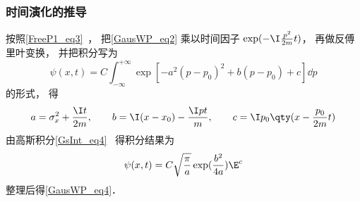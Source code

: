 \subsubsection{时间演化的推导}
按照\autoref{FreeP1_eq3}~， 把\autoref{GausWP_eq2} 乘以时间因子 $\exp(-\I \frac{p^2}{2m}t)$， 再做反傅里叶变换， 并把积分写为
\begin{equation}
\psi(x, t) = C\int_{-\infty}^{+\infty} \exp[-a^2(p-p_0)^2 + b(p-p_0) + c] \dd{p}
\end{equation}
的形式， 得
\begin{equation}
a = \sigma_x^2 + \frac{\I t}{2m}, \qquad
b = \I(x-x_0) - \frac{\I pt}{m}, \qquad
c = \I p_0 \qty(x - \frac{p_0}{2m} t)
\end{equation}
由高斯积分\autoref{GsInt_eq4}~ 得积分结果为
\begin{equation}
\psi(x, t) = C\sqrt{\frac{\pi}{a}} \exp(\frac{b^2}{4a})\E^c
\end{equation}
整理后得\autoref{GausWP_eq4}．
